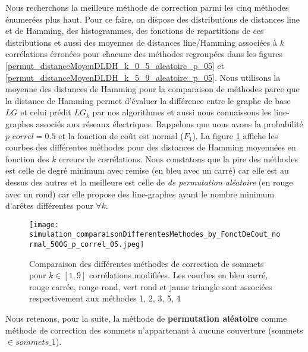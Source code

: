 Nous recherchons la meilleure m\'ethode de correction parmi les cinq m\'ethodes \'enumer\'ees plus haut. 
Pour ce faire, on dispose des distributions de distances line et de Hamming, des histogrammes, des fonctions de repartitions de ces distributions et aussi des moyennes de distances line/Hamming associ\'ees \`a $k$ corr\'elations \'erron\'ees pour chacune des m\'ethodes regroup\'ees dans les figures \ref{permut_distanceMoyenDLDH_k_0_5_aleatoire_p_05} et \ref{permut_distanceMoyenDLDH_k_5_9_aleatoire_p_05}.  
Nous utilisons la moyenne des distances de Hamming pour la comparaison de m\'ethodes parce que la distance de Hamming permet d'\'evaluer la diff\'erence entre le graphe de base $LG$ et celui pr\'edit $LG_k$ par nos algorithmes et aussi nous connaissons les line-graphes associ\'es aux r\'eseaux \'electriques.\newline
Rappelons que nous avons la probabilit\'e $p\_correl=0.5$ et la fonction de co\^ut est normal ($F_1$).
La figure \ref{compareDifferentesMethodesCorrectionSommets_fct_cout_normal_p05} affiche les courbes  des diff\'erentes m\'ethodes pour des distances de Hamming moyenn\'ees en fonction des $k$ erreurs de corr\'elations.
\newline
Nous constatons  que la pire des m\'ethodes est celle de degr\'e minimum avec remise (en bleu avec un carr\'e) car elle est au dessus des autres et la meilleure est celle de {\em de permutation al\'eatoire} (en rouge avec un rond) car elle propose des line-graphes ayant  le nombre minimum d'ar\^etes diff\'erentes pour $ \forall k$.\newline
\begin{figure}[htb!] 
\centering
\texttt{[image: simulation\_comparaisonDifferentesMethodes\_by\_FonctDeCout\_normal\_500G\_p\_correl\_05.jpeg]}
\caption{ Comparaison des diff\'erentes m\'ethodes de correction de sommets pour $k \in [1,9]$ corr\'elations modifi\'ees. Les courbes en bleu carr\'e, rouge carr\'ee, rouge rond, vert rond et jaune triangle sont associ\'ees respectivement aux m\'ethodes 1, 2, 3, 5, 4 }
\label{compareDifferentesMethodesCorrectionSommets_fct_cout_normal_p05} 
\end{figure}
Nous retenons, pour la suite, la m\'ethode de {\bf permutation al\'eatoire} comme m\'ethode de correction des sommets n'appartenant \`a aucune couverture (sommets $\in sommets\_1$).